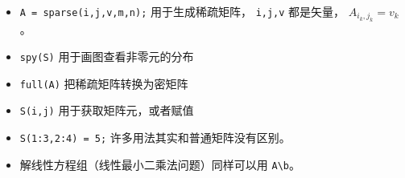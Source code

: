 
\begin{issues}
\issueDraft
\end{issues}

\begin{itemize}
\item \verb`A = sparse(i,j,v,m,n);` 用于生成稀疏矩阵， \verb`i,j,v` 都是矢量， $A_{i_k,j_k} = v_k$。
\item \verb`spy(S)` 用于画图查看非零元的分布
\item \verb`full(A)` 把稀疏矩阵转换为密矩阵
\item \verb`S(i,j)` 用于获取矩阵元，或者赋值
\item \verb`S(1:3,2:4) = 5;` 许多用法其实和普通矩阵没有区别。
\item 解线性方程组（线性最小二乘法问题）同样可以用 \verb`A\b`。
\end{itemize}
